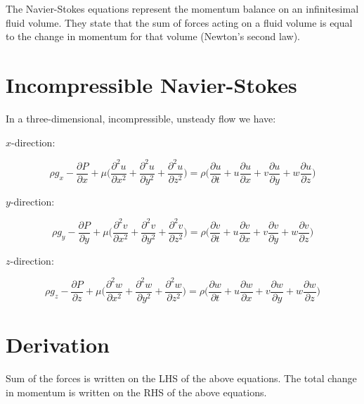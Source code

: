 The Navier-Stokes equations represent the momentum balance on an infinitesimal fluid volume. They state that the sum of forces acting on a fluid volume is equal to the change in momentum for that volume (Newton's second law).

\section{Incompressible Navier-Stokes}

In a three-dimensional, incompressible, unsteady flow we have:

$x$-direction:

\begin{equation} \label{eq:NS_x}
\rho g_x - \frac{\partial P}{\partial x} + \mu \Big( \frac{\partial^2 u}{\partial x^2} + \frac{\partial^2 u}{\partial y^2} + \frac{\partial^2 u}{\partial z^2}\Big) = \rho \Big( \frac{\partial u}{\partial t} + u \frac{\partial u}{\partial x} + v \frac{\partial u}{\partial y} + w \frac{\partial u}{\partial z} \Big)
\end{equation}

$y$-direction:

\begin{equation} \label{eq:NS_y}
\rho g_y - \frac{\partial P}{\partial y} + \mu \Big( \frac{\partial^2 v}{\partial x^2} + \frac{\partial^2 v}{\partial y^2} + \frac{\partial^2 v}{\partial z^2}\Big) = \rho \Big( \frac{\partial v}{\partial t} + u \frac{\partial v}{\partial x} + v \frac{\partial v}{\partial y} + w \frac{\partial v}{\partial z} \Big)
\end{equation}

$z$-direction:

\begin{equation} \label{eq:NS_z}
\rho g_z - \frac{\partial P}{\partial z} + \mu \Big( \frac{\partial^2 w}{\partial x^2} + \frac{\partial^2 w}{\partial y^2} + \frac{\partial^2 w}{\partial z^2}\Big) = \rho \Big( \frac{\partial w}{\partial t} + u \frac{\partial w}{\partial x} + v \frac{\partial w}{\partial y} + w \frac{\partial w}{\partial z} \Big)
\end{equation}

\section{Derivation}

Sum of the forces is written on the LHS of the above equations. The total change in momentum is written on the RHS of the above equations.


